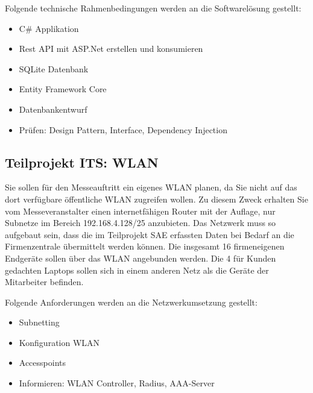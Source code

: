 Folgende technische Rahmenbedingungen werden an die Softwarelösung gestellt:
\begin{itemize}
	\item C\# Applikation
	\item Rest API mit ASP.Net erstellen und konsumieren
	\item SQLite Datenbank
	\item Entity Framework Core
	\item Datenbankentwurf
	\item Prüfen: Design Pattern, Interface, Dependency Injection
\end{itemize}


\subsection{Teilprojekt ITS: WLAN}
Sie sollen für den Messeauftritt ein eigenes WLAN planen, da Sie nicht auf das dort verfügbare öffentliche WLAN zugreifen wollen. Zu diesem Zweck erhalten Sie vom Messeveranstalter einen internetfähigen Router mit der Auflage, nur Subnetze im Bereich 192.168.4.128/25 anzubieten. 
Das Netzwerk muss so aufgebaut sein, dass die im Teilprojekt SAE erfassten Daten bei Bedarf an die Firmenzentrale übermittelt werden können. Die insgesamt 16 firmeneigenen Endgeräte sollen über das WLAN angebunden werden. Die 4 für Kunden gedachten Laptops sollen sich in einem anderen Netz als die Geräte der Mitarbeiter befinden.

Folgende Anforderungen werden an die Netzwerkumsetzung gestellt:
\begin{itemize}
	\item Subnetting
	\item Konfiguration WLAN
	\item Accesspoints
	\item Informieren: WLAN Controller, Radius, AAA-Server
\end{itemize}


